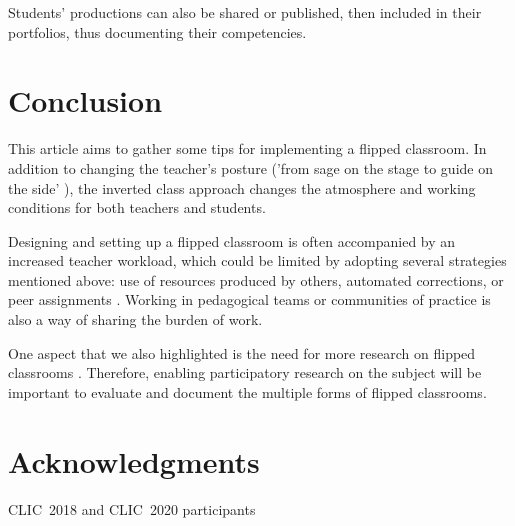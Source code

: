\documentclass[10pt,letterpaper]{article}
\begin{document}
Students’ productions can also be shared or published, then included in their portfolios, thus documenting their competencies. 


\section*{Conclusion}

This article aims to gather some tips for implementing a flipped classroom. In addition to changing the teacher's posture ('from sage on the stage to guide on the side' \cite{king_sage_1993}), the inverted class approach changes the atmosphere and working conditions for both teachers and students.

Designing and setting up a flipped classroom is often accompanied by an increased teacher workload, which could be limited by adopting several strategies mentioned above: use of resources produced by others, automated corrections, or peer assignments \cite{guilbault_classe_2017}. Working in pedagogical teams or communities of practice is also a way of sharing the burden of work.

One aspect that we also highlighted is the need for more research on flipped classrooms \cite{hew_does_2020}. 
Therefore, enabling participatory research on the subject will be important to evaluate and document the multiple forms of flipped classrooms.


\section*{Acknowledgments}
{CLIC~2018 and CLIC~2020 participants}

\nolinenumbers

%
%
% 


\end{document}
